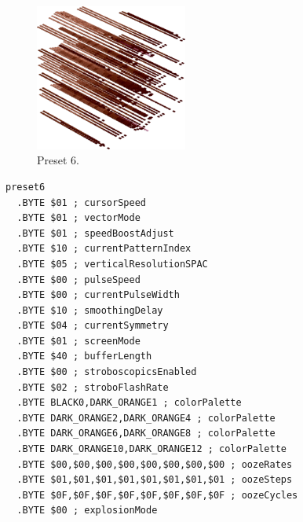 \begin{minipage}[b]{0.48\linewidth}
\begin{figure}[H]                                                          
  \centering                                                             
  \begin{adjustbox}{width=5cm,center}                                   
  \includegraphics[width=5cm]{src/colorspace_presets/preset6-45.png}%
  \end{adjustbox}                                                        
\caption*{Preset 6.}                                           
\end{figure}                                                               
\end{minipage}
\hspace{0.1cm}
\begin{minipage}[b]{0.48\linewidth}                            
\begin{lstlisting}[basicstyle=\ttfamily\tiny]
preset6
  .BYTE $01 ; cursorSpeed
  .BYTE $01 ; vectorMode
  .BYTE $01 ; speedBoostAdjust
  .BYTE $10 ; currentPatternIndex
  .BYTE $05 ; verticalResolutionSPAC
  .BYTE $00 ; pulseSpeed
  .BYTE $00 ; currentPulseWidth
  .BYTE $10 ; smoothingDelay
  .BYTE $04 ; currentSymmetry
  .BYTE $01 ; screenMode
  .BYTE $40 ; bufferLength
  .BYTE $00 ; stroboscopicsEnabled
  .BYTE $02 ; stroboFlashRate
  .BYTE BLACK0,DARK_ORANGE1 ; colorPalette
  .BYTE DARK_ORANGE2,DARK_ORANGE4 ; colorPalette
  .BYTE DARK_ORANGE6,DARK_ORANGE8 ; colorPalette
  .BYTE DARK_ORANGE10,DARK_ORANGE12 ; colorPalette
  .BYTE $00,$00,$00,$00,$00,$00,$00,$00 ; oozeRates
  .BYTE $01,$01,$01,$01,$01,$01,$01,$01 ; oozeSteps
  .BYTE $0F,$0F,$0F,$0F,$0F,$0F,$0F,$0F ; oozeCycles
  .BYTE $00 ; explosionMode
\end{lstlisting}
\end{minipage}

\vspace*{0.2cm}

